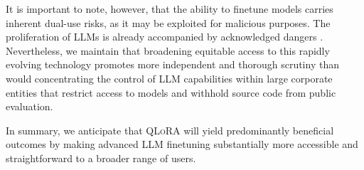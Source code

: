 It is important to note, however, that the ability to finetune models carries inherent dual-use risks, as it may be exploited for malicious purposes. The proliferation of LLMs is already accompanied by acknowledged dangers \citep{bommasani2021opportunities,bender2021dangers}. Nevertheless, we maintain that broadening equitable access to this rapidly evolving technology promotes more independent and thorough scrutiny than would concentrating the control of LLM capabilities within large corporate entities that restrict access to models and withhold source code from public evaluation.

In summary, we anticipate that \textsc{QLoRA} will yield predominantly beneficial outcomes by making advanced LLM finetuning substantially more accessible and straightforward to a broader range of users.